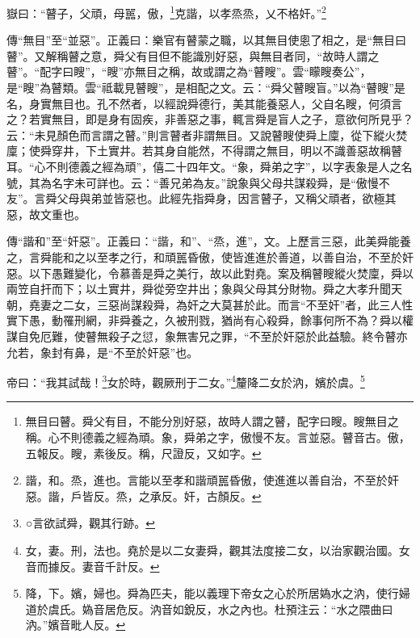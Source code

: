 嶽曰：“瞽子，父頑，母嚚，傲，\footnote{無目曰瞽。舜父有目，不能分別好惡，故時人謂之瞽，配字曰瞍。瞍無目之稱。心不則德義之經為頑。象，舜弟之字，傲慢不友。言並惡。瞽音古。傲，五報反。瞍，素後反。稱，尺證反，又如字。}克諧，以孝烝烝，乂不格奸。”\footnote{諧，和。烝，進也。言能以至孝和諧頑嚚昏傲，使進進以善自治，不至於奸惡。諧，戶皆反。烝，之承反。奸，古顏反。}

{\noindent\zhuan{}\fzbyks 傳“無目”至“並惡”。正義曰：樂官有瞽蒙之職，以其無目使悤了相之，是“無目曰瞽”。又解稱瞽之意，舜父有目但不能識別好惡，與無目者同，“故時人謂之瞽”。“配字曰瞍”，“瞍”亦無目之稱，故或謂之為“瞽瞍”。雲“矇瞍奏公”，是“瞍”為瞽類。雲“祗載見瞽瞍”，是相配之文。云：“舜父瞽瞍盲。”以為“瞽瞍”是名，身實無目也。孔不然者，以經說舜德行，美其能養惡人，父自名瞍，何須言之？若實無目，即是身有固疾，非善惡之事，輒言舜是盲人之子，意欲何所見乎？云：“未見顏色而言謂之瞽。”則言瞽者非謂無目。又說瞽瞍使舜上廩，從下縱火焚廩；使舜穿井，下土實井。若其身自能然，不得謂之無目，明以不識善惡故稱瞽耳。“心不則德義之經為頑”，僖二十四年文。“象，舜弟之字”，以字表象是人之名號，其為名字未可詳也。云：“善兄弟為友。”說象與父母共謀殺舜，是“傲慢不友”。言舜父母與弟並皆惡也。此經先指舜身，因言瞽子，又稱父頑者，欲極其惡，故文重也。 \par}

{\noindent\zhuan{}\fzbyks 傳“諧和”至“奸惡”。正義曰：“諧，和”、“烝，進”，文。上歷言三惡，此美舜能養之，言舜能和之以至孝之行，和頑嚚昏傲，使皆進進於善道，以善自治，不至於奸惡。以下愚難變化，令慕善是舜之美行，故以此對堯。案及稱瞽瞍縱火焚廩，舜以兩笠自扞而下；以土實井，舜從旁空井出；象與父母其分財物。舜之大孝升聞天朝，堯妻之二女，三惡尚謀殺舜，為奸之大莫甚於此。而言“不至奸”者，此三人性實下愚，動罹刑網，非舜養之，久被刑戮，猶尚有心殺舜，餘事何所不為？舜以權謀自免厄難，使瞽無殺子之愆，象無害兄之罪，“不至於奸惡於此益驗。終令瞽亦允若，象封有鼻，是“不至於奸惡”也。 \par}

帝曰：“我其試哉！\footnote{○言欲試舜，觀其行跡。}女於時，觀厥刑于二女。”\footnote{女，妻。刑，法也。堯於是以二女妻舜，觀其法度接二女，以治家觀治國。女音而據反。妻音千計反。}釐降二女於汭，嬪於虞。\footnote{降，下。嬪，婦也。舜為匹夫，能以義理下帝女之心於所居媯水之汭，使行婦道於虞氏。媯音居危反。汭音如銳反，水之內也。杜預注云：“水之隈曲曰汭。”嬪音毗人反。}

